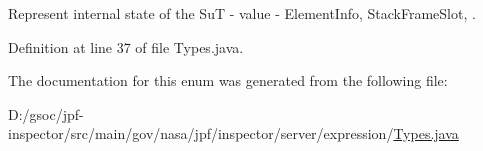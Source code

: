 Represent internal state of the SuT -\/ value -\/ Element\+Info, Stack\+Frame\+Slot, . 



Definition at line 37 of file Types.\+java.



The documentation for this enum was generated from the following file\+:\begin{DoxyCompactItemize}
\item 
D\+:/gsoc/jpf-\/inspector/src/main/gov/nasa/jpf/inspector/server/expression/\hyperlink{_types_8java}{Types.\+java}\end{DoxyCompactItemize}
